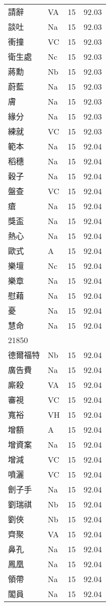 \documentclass[twocolumn]{book}
\begin{document}
\begin{supertabular}{llrr}
請辭 & VA & 15 &  92.03\\
談吐 & Na & 15 &  92.03\\
衝撞 & VC & 15 &  92.03\\
衛生處 & Nc & 15 &  92.03\\
蔣勳 & Nb & 15 &  92.03\\
蔚藍 & Na & 15 &  92.03\\
膚 & Na & 15 &  92.03\\
緣分 & Na & 15 &  92.03\\
練就 & VC & 15 &  92.03\\
範本 & Na & 15 &  92.04\\
稻穗 & Na & 15 &  92.04\\
穀子 & Na & 15 &  92.04\\
盤查 & VC & 15 &  92.04\\
瘡 & Na & 15 &  92.04\\
獎盃 & Na & 15 &  92.04\\
熱心 & Na & 15 &  92.04\\
歐式 & A & 15 &  92.04\\
樂壇 & Nc & 15 &  92.04\\
樂章 & Na & 15 &  92.04\\
慰藉 & Na & 15 &  92.04\\
憂 & Na & 15 &  92.04\\
慧命 & Na & 15 &  92.04\\
21850\\
德爾福特 & Nb & 15 &  92.04\\
廣告費 & Na & 15 &  92.04\\
廝殺 & VA & 15 &  92.04\\
審視 & VC & 15 &  92.04\\
寬裕 & VH & 15 &  92.04\\
增額 & A & 15 &  92.04\\
增資案 & Na & 15 &  92.04\\
增減 & VC & 15 &  92.04\\
噴灑 & VC & 15 &  92.04\\
劊子手 & Na & 15 &  92.04\\
劉瑞祺 & Nb & 15 &  92.04\\
劉俠 & Nb & 15 &  92.04\\
齊聚 & VA & 15 &  92.04\\
鼻孔 & Na & 15 &  92.04\\
鳳凰 & Na & 15 &  92.04\\
領帶 & Na & 15 &  92.04\\
閣員 & Na & 15 &  92.04\\

\end{supertabular}
\end{document}
